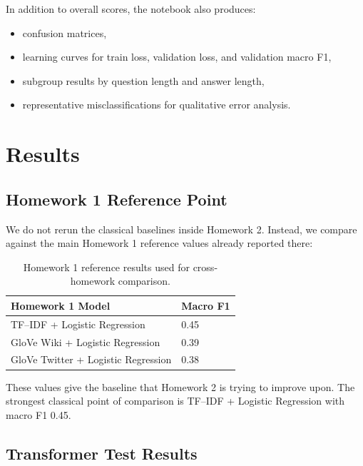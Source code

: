\documentclass[12pt]{fphw}
\newcommand{\hwonebestf}{0.45}
\newcommand{\hwonewikitwo}{0.39}
\newcommand{\hwonetwitter}{0.38}
\begin{document}
In addition to overall scores, the notebook also produces:
\begin{itemize}
	\item confusion matrices,
	\item learning curves for train loss, validation loss, and validation macro F1,
	\item subgroup results by question length and answer length,
	\item representative misclassifications for qualitative error analysis.
\end{itemize}

\section{Results}

\subsection{Homework 1 Reference Point}

We do not rerun the classical baselines inside Homework 2. Instead, we compare against the main Homework 1 reference values already reported there:

\begin{table}[h]
\centering
\begin{tabular}{ll}
\toprule
Homework 1 Model & Macro F1 \\
\midrule
TF--IDF + Logistic Regression & \hwonebestf \\
GloVe Wiki + Logistic Regression & \hwonewikitwo \\
GloVe Twitter + Logistic Regression & \hwonetwitter \\
\bottomrule
\end{tabular}
\caption{Homework 1 reference results used for cross-homework comparison.}
\label{tab:hw1-reference}
\end{table}

These values give the baseline that Homework 2 is trying to improve upon. The strongest classical point of comparison is TF--IDF + Logistic Regression with macro F1 \hwonebestf.

\subsection{Transformer Test Results}
\end{document}
